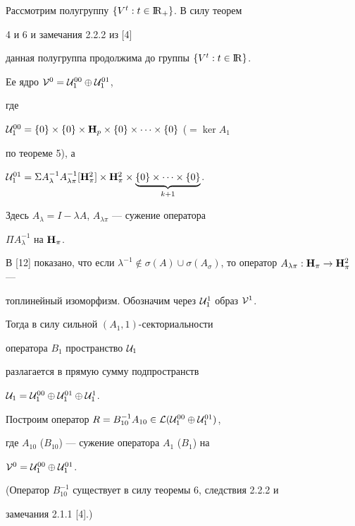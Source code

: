 Рассмотрим полугруппу $\{V^t: t \in {{\mathrm I}\!{\mathrm R}}_+\}$. В силу теорем


4 и 6 и замечания 2.2.2 из [4]


данная полугруппа продолжима до группы $\{V^t: t \in {{\mathrm I}\!{\mathrm R}} \}$.


Ее ядро ${\cal V}^0={\cal U}_1^{00} \oplus {\cal U}_1^{01}$,


где


${\cal U}_1^{00}=\{0 \} \times \{0 \} \times {\bold H}_p \times \{0 \}


\times \dotsb \times \{0\}$ ($=\ker A_1$


по теореме 5), а


${\cal U}_1^{01}=\Sigma A_{\lambda}^{-1}A_{\lambda \pi}^{-1}


[{\bold H}_{\pi}^2] \times {\bold H}_{\pi}^2 \times


\underbrace{\{0 \} \times \dotsb \times \{0\}}_{k+1}$.


Здесь $A_{\lambda}=I- \lambda A$, $A_{\lambda \pi}$ --- сужение оператора


$\Pi A_{\lambda}^{-1}$ на ${\bold H}_{\pi}$.


В [12] показано, что если ${\lambda}^{-1} \notin \sigma (A)


\cup \sigma (A_{\sigma})$, то оператор $A_{\lambda \pi}: {\bold H}_{\pi} \to


{\bold H}_{\pi}^2$ ---


топлинейный изоморфизм. Обозначим через ${\cal U}_1^1$ образ ${\cal V}^1$.


Тогда в силу сильной $(A_1,1)$-секториальности 


оператора $B_1$ пространство ${\cal U}_1$


разлагается в прямую сумму подпространств


${\cal U}_1={\cal U}_1^{00} \oplus {\cal U}_1^{01}


\oplus {\cal U}_1^1$.





Построим оператор $R=B_{10}^{-1}A_{10} \in {\cal L} ({\cal U}_1^{00}


\oplus {\cal U}_1^{01})$,


где $A_{10}$ ($B_{10}$) --- сужение оператора $A_1$ ($B_1$) на


${\cal V}^0={\cal U}_1^{00} \oplus {\cal U}_1^{01}$.


(Оператор $B^{-1}_{10}$ существует в силу теоремы 6, следствия 2.2.2 и


замечания 2.1.1 [4].)


